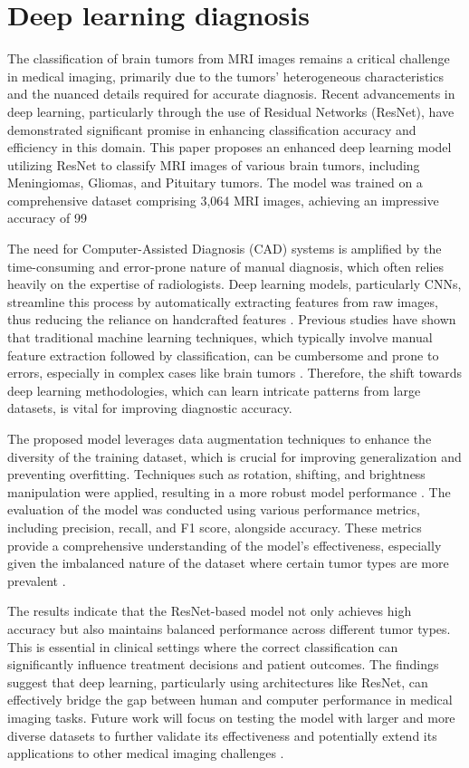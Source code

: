\documentclass[runningheads]{llncs}
\begin{document}
\section{Deep learning diagnosis}
The classification of brain tumors from MRI images remains a critical challenge in medical imaging, primarily due to the tumors' heterogeneous characteristics and the nuanced details required for accurate diagnosis. Recent advancements in deep learning, particularly through the use of Residual Networks (ResNet), have demonstrated significant promise in enhancing classification accuracy and efficiency in this domain. This paper proposes an enhanced deep learning model utilizing ResNet to classify MRI images of various brain tumors, including Meningiomas, Gliomas, and Pituitary tumors. The model was trained on a comprehensive dataset comprising 3,064 MRI images, achieving an impressive accuracy of 99%

The need for Computer-Assisted Diagnosis (CAD) systems is amplified by the time-consuming and error-prone nature of manual diagnosis, which often relies heavily on the expertise of radiologists. Deep learning models, particularly CNNs, streamline this process by automatically extracting features from raw images, thus reducing the reliance on handcrafted features \cite{Sarah_2020}. Previous studies have shown that traditional machine learning techniques, which typically involve manual feature extraction followed by classification, can be cumbersome and prone to errors, especially in complex cases like brain tumors \cite{Sarah_2020}. Therefore, the shift towards deep learning methodologies, which can learn intricate patterns from large datasets, is vital for improving diagnostic accuracy.

The proposed model leverages data augmentation techniques to enhance the diversity of the training dataset, which is crucial for improving generalization and preventing overfitting. Techniques such as rotation, shifting, and brightness manipulation were applied, resulting in a more robust model performance \cite{Sarah_2020}. The evaluation of the model was conducted using various performance metrics, including precision, recall, and F1 score, alongside accuracy. These metrics provide a comprehensive understanding of the model's effectiveness, especially given the imbalanced nature of the dataset where certain tumor types are more prevalent \cite{Sarah_2020}.

The results indicate that the ResNet-based model not only achieves high accuracy but also maintains balanced performance across different tumor types. This is essential in clinical settings where the correct classification can significantly influence treatment decisions and patient outcomes. The findings suggest that deep learning, particularly using architectures like ResNet, can effectively bridge the gap between human and computer performance in medical imaging tasks. Future work will focus on testing the model with larger and more diverse datasets to further validate its effectiveness and potentially extend its applications to other medical imaging challenges \cite{Sarah_2020}.
\end{document}
